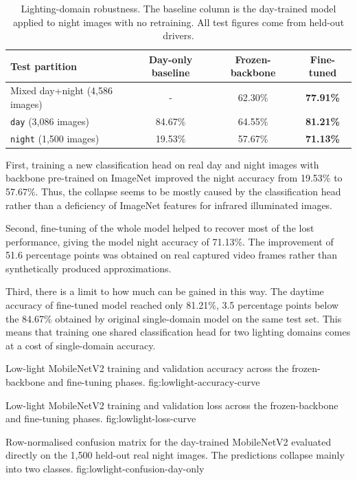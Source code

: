\begin{table}[htbp]
\centering
\caption{Lighting-domain robustness. The baseline column is the day-trained model applied to night images with no retraining. All test figures come from held-out drivers.}
\label{tab:lowlight}
\small
\begin{tabular}{lccc}
\toprule
\textbf{Test partition} & \textbf{Day-only baseline} & \textbf{Frozen-backbone} & \textbf{Fine-tuned} \\
\midrule
Mixed day+night (4{,}586 images) & - & 62.30\% & \textbf{77.91\%} \\
\texttt{day} (3{,}086 images) & 84.67\% & 64.55\% & \textbf{81.21\%} \\
\texttt{night} (1{,}500 images) & 19.53\% & 57.67\% & \textbf{71.13\%} \\
\bottomrule
\end{tabular}
\end{table}

First, training a new classification head on real day and night images with backbone pre-trained on ImageNet improved the night accuracy from 19.53\% to 57.67\%. Thus, the collapse seems to be mostly caused by the classification head rather than a deficiency of ImageNet features for infrared illuminated images.

Second, fine-tuning of the whole model helped to recover most of the lost performance, giving the model night accuracy of 71.13\%. The improvement of 51.6 percentage points was obtained on real captured video frames rather than synthetically produced approximations.

Third, there is a limit to how much can be gained in this way. The daytime accuracy of fine-tuned model reached only 81.21\%, 3.5 percentage points below the 84.67\% obtained by original single-domain model on the same test set. This means that training one shared classification head for two lighting domains comes at a cost of single-domain accuracy.

{Low-light MobileNetV2 training and validation accuracy across the frozen-backbone and fine-tuning phases.}
{fig:lowlight-accuracy-curve}

{Low-light MobileNetV2 training and validation loss across the frozen-backbone and fine-tuning phases.}
{fig:lowlight-loss-curve}

{Row-normalised confusion matrix for the day-trained MobileNetV2 evaluated directly on the 1,500 held-out real night images. The predictions collapse mainly into two classes.}
{fig:lowlight-confusion-day-only}

